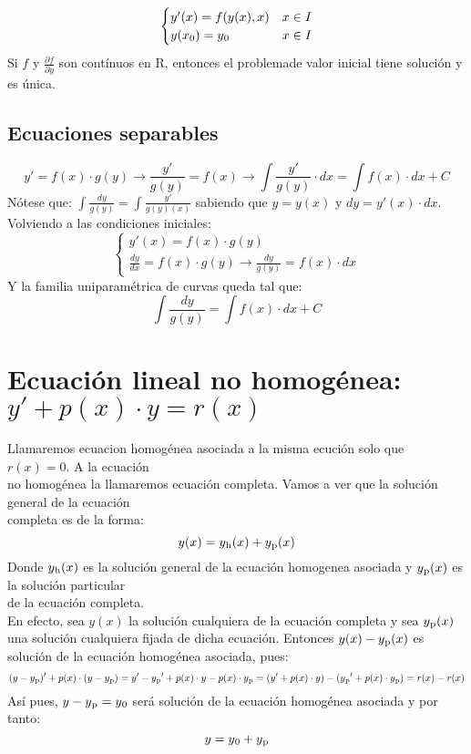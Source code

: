\documentclass{article}
\begin{document}
\begin{equation}
    \begin{cases}
        y'(x)=f(y(x),x) & x \in I \\
        y(x\textsubscript{0})=y\textsubscript{0} & x \in I
    \end{cases} 
\end{equation}
Si $f$ y $\frac{\partial f}{\partial y}$ son contínuos en R, entonces el problemade valor inicial tiene solución y es única.

\subsection{Ecuaciones separables}
\[y'=f(x) \cdot g(y) \rightarrow \frac{y'}{g(y)}=f(x) \rightarrow \int\frac{y'}{g(y)}\cdot dx = \int f(x) \cdot dx + C\]
Nótese que: $\int\frac{dy}{g(y)}=\int\frac{y'}{g(y)(x)}$ sabiendo que $y = y(x)$ y $dy = y'(x)\cdot dx$.\\
Volviendo a las condiciones iniciales:
\begin{equation}
    \begin{cases}
        y'(x)=f(x)\cdot g(y) \\
        \frac{dy}{dx}=f(x)\cdot g(y) \rightarrow \frac{dy}{g(y)}=f(x)\cdot dx
    \end{cases} 
\end{equation}
Y la familia uniparamétrica de curvas queda tal que:
\[\int\frac{dy}{g(y)}=\int f(x)\cdot dx + C\]

\section{Ecuación lineal no homogénea: $y'+p(x)\cdot y=r(x)$}
Llamaremos ecuacion homogénea asociada a la misma ecución solo que $r(x)=0$. A la ecuación\\
no homogénea la llamaremos ecuación completa. Vamos a ver que la solución general de la ecuación\\
completa es de la forma:
\[y(x) = y\textsubscript{h}(x)+y\textsubscript{p}(x)\]
Donde $y\textsubscript{h}(x)$ es la solución general de la ecuación homogenea asociada y $y\textsubscript{p}(x)$ es la solución particular \\
de la ecuación completa.\\
En efecto, sea $y(x)$ la solución cualquiera de la ecuación completa y sea $y\textsubscript{p}(x)$ una solución cualquiera fijada de dicha ecuación.
Entonces $y(x)-y\textsubscript{p}(x)$ es solución de la ecuación homogénea asociada, pues:
\[(y-y\textsubscript{p})'+p(x)\cdot (y-y\textsubscript{p})=y'-y\textsubscript{p}'+p(x)\cdot y-p(x)\cdot y\textsubscript{p}=(y'+p(x)\cdot y)-(y\textsubscript{p}'+p(x)\cdot y\textsubscript{p})=r(x)-r(x)\]
Así pues, $y-y\textsubscript{p}=y\textsubscript{0}$ será solución de la ecuación homogénea asociada y por tanto:
\[y=y\textsubscript{0}+y\textsubscript{p}\]
\end{document}
